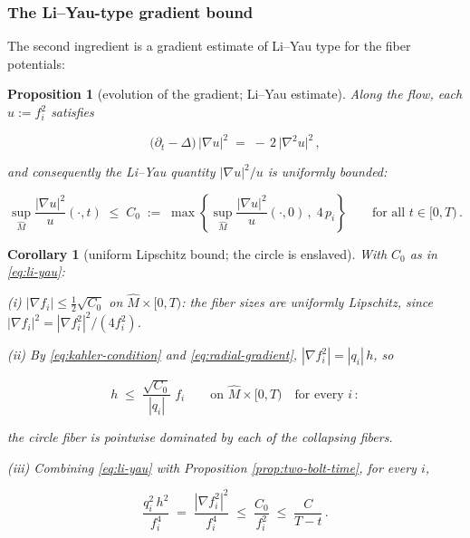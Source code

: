 \documentclass[11pt]{amsart}
\theoremstyle{plain}
\numberwithin{equation}{section}
\newtheorem{proposition}[theorem]{Proposition}
\newtheorem{corollary}[theorem]{Corollary}
\theoremstyle{definition}
\theoremstyle{remark}
\begin{document}
\subsubsection{The Li--Yau-type gradient bound}\label{subsec:li-yau-two-bolt}

The second ingredient is a gradient estimate of Li--Yau type \cite{LY} for the fiber potentials:

\begin{proposition}[evolution of the gradient; Li--Yau estimate]\label{prop:li-yau}
	Along the flow, each $u := f_i^2$ satisfies
	
	\begin{equation}\label{eq:gradient-evolution}
		\big( \partial_t - \Delta \big)\, \big| \nabla u \big|^2 \;=\; -\, 2\, \big| \nabla^2 u \big|^2 \,,
	\end{equation}
	
	and consequently the Li--Yau quantity \cite{LY} $| \nabla u |^2 / u$ is uniformly bounded:
	
	\begin{equation}\label{eq:li-yau}
		\sup_{\widehat{M}} \frac{| \nabla u |^2}{u} (\cdot, t) \;\leq\; C_0 \;:=\; \max \left\{ \sup_{\widehat{M}} \frac{| \nabla u |^2}{u} (\cdot, 0) \,, \; 4\, p_i \right\} \qquad \text{for all } t \in [0, T) \,.
	\end{equation}
	
\end{proposition}

\begin{corollary}[uniform Lipschitz bound; the circle is enslaved]\label{cor:circle-lipschitz}
	With $C_0$ as in \eqref{eq:li-yau}:
	
	\emph{(i)} $| \nabla f_i | \leq \tfrac{1}{2} \sqrt{C_0}$ on $\widehat{M} \times [0, T)$: the fiber sizes are uniformly Lipschitz, since $| \nabla f_i |^2 = | \nabla f_i^2 |^2 / ( 4 f_i^2 )$.
	
	\emph{(ii)} By \eqref{eq:kahler-condition} and \eqref{eq:radial-gradient}, $| \nabla f_i^2 | = | q_i |\, h$, so
	
	\begin{equation}\label{eq:circle-lipschitz}
		h \;\leq\; \frac{\sqrt{C_0}}{| q_i |}\; f_i \qquad \text{on } \widehat{M} \times [0, T) \quad \text{for every } i \,:
	\end{equation}
	
	the circle fiber is pointwise dominated by each of the collapsing fibers.
	
	\emph{(iii)} Combining \eqref{eq:li-yau} with Proposition \ref{prop:two-bolt-time}, for every $i$,
	
	\[
	\frac{q_i^2\, h^2}{f_i^4} \;=\; \frac{| \nabla f_i^2 |^2}{f_i^4} \;\leq\; \frac{C_0}{f_i^2} \;\leq\; \frac{C}{T - t} \,.
	\]
	
\end{corollary}
\end{document}

